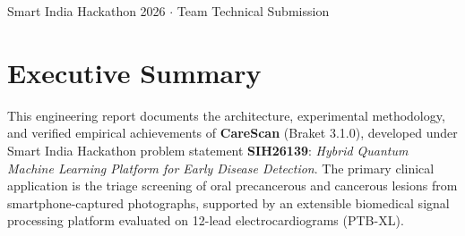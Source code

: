 \documentclass[11pt,a4paper]{report}
\begin{document}
\begin{titlepage}
\vfill
{\footnotesize Smart India Hackathon 2026 $\cdot$ Team Technical Submission}
\end{titlepage}


\chapter*{Executive Summary}

This engineering report documents the architecture, experimental methodology, and verified empirical achievements of \textbf{CareScan} (Braket 3.1.0), developed under Smart India Hackathon problem statement \textbf{SIH26139}: \textit{Hybrid Quantum Machine Learning Platform for Early Disease Detection}. The primary clinical application is the triage screening of oral precancerous and cancerous lesions from smartphone-captured photographs, supported by an extensible biomedical signal processing platform evaluated on 12-lead electrocardiograms (PTB-XL).
\end{document}
